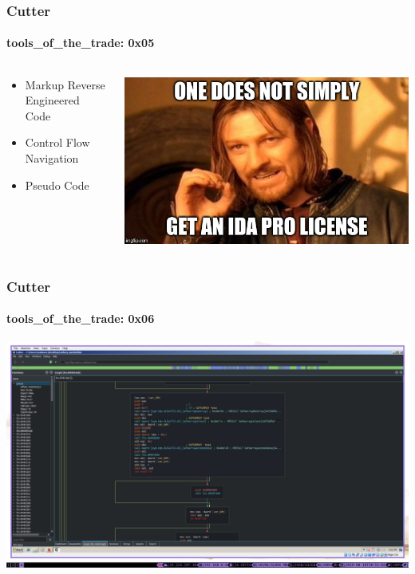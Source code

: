 \documentclass[aspectratio=169]{beamer}
\begin{document}
\begin{frame}
  \frametitle{Cutter}
  \framesubtitle{tools\_of\_the\_trade: 0x05}
  \begin{columns}
    \begin{column}{.3\textwidth}
      \begin{itemize}
      \item{Markup Reverse Engineered Code}
      \item{Control Flow Navigation}
      \item{Pseudo Code}
      \end{itemize}
    \end{column}
    \hfill
    \begin{column}{.7\textwidth}
      \begin{center}
        \includegraphics[scale=0.4]{ida-pro-meme}
      \end{center}
    \end{column}
  \end{columns}
\end{frame}

\begin{frame}
  \frametitle{Cutter}
  \framesubtitle{tools\_of\_the\_trade: 0x06}
  \begin{center}
    \includegraphics[scale=0.18]{cutter-graph}
  \end{center}
\end{frame}
\end{document}
